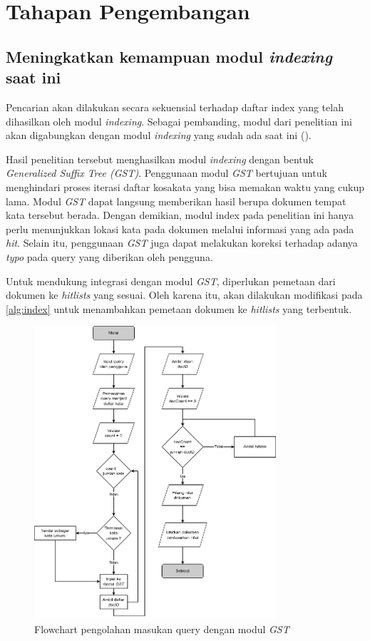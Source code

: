 \section{Tahapan Pengembangan}

\subsection{Meningkatkan kemampuan modul \textit{indexing} saat ini}

Pencarian akan dilakukan secara sekuensial terhadap daftar index yang telah
dihasilkan oleh modul \textit{indexing}. Sebagai pembanding, modul dari
penelitian ini akan digabungkan dengan modul \textit{indexing} yang sudah ada 
saat ini (\cite{zaidan2023gst}).

Hasil penelitian tersebut menghasilkan modul \textit{indexing} dengan bentuk
\textit{Generalized Suffix Tree (GST)}. Penggunaan modul \textit{GST} bertujuan
untuk menghindari proses iterasi daftar kosakata yang bisa memakan waktu yang
cukup lama. Modul \textit{GST} dapat langsung memberikan hasil berupa dokumen
tempat kata tersebut berada. Dengan demikian, modul index pada penelitian ini
hanya perlu menunjukkan lokasi kata pada dokumen melalui informasi yang ada
pada \textit{hit}. Selain itu, penggunaan \textit{GST} juga dapat melakukan
koreksi terhadap adanya \textit{typo} pada query yang diberikan oleh pengguna.

Untuk mendukung integrasi dengan modul \textit{GST}, diperlukan pemetaan dari
dokumen ke \textit{hitlists} yang sesuai. Oleh karena itu, akan dilakukan 
modifikasi pada \ref{alg:index} untuk menambahkan pemetaan dokumen ke
\textit{hitlists} yang terbentuk.

\begin{figure}[H]
  \centering{}
	\includegraphics[width=0.8\textwidth]{gambar/flowchart_pencarian_gst}
  \caption{Flowchart pengolahan masukan query dengan modul \textit{GST}}
\end{figure}

